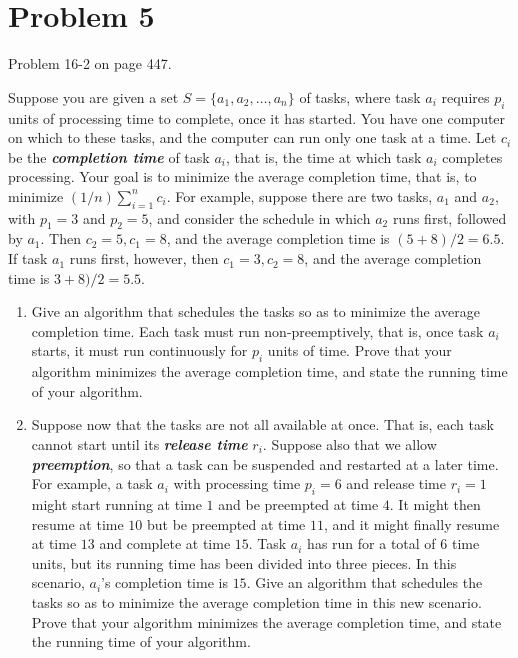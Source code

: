 \documentclass{../../class}
\begin{document}
\section*{Problem 5}
\begin{tcolorbox}
    Problem 16-2 on page 447.
\end{tcolorbox}
Suppose you are given a set $S = \{a_1, a_2, \dots, a_n\}$ of tasks, where task $a_i$ requires $p_i$ units of processing time to complete, once it has started. You have one computer on which to these tasks, and the computer can run only one task at a time. Let $c_i$ be the \textbf{\textit{completion time}} of task $a_i$, that is, the time at which task $a_i$ completes processing. Your goal is to minimize the average completion time, that is, to minimize $(1 / n) \sum_{i=1}^{n} c_i$. For example, suppose there are two tasks, $a_1$ and $a_2$, with $p_1 = 3$ and $p_2 = 5$, and consider the schedule in which $a_2$ runs first, followed by $a_1$. Then $c_2 = 5, c_1 = 8$, and the average completion time is $(5 + 8) / 2 = 6.5$. If task $a_1$ runs first, however, then $c_1 = 3, c_2 = 8$, and the average completion time is $3 + 8) / 2 = 5.5$.
\begin{enumerate}[label=\textbf{\textit{\alph*}}.]
    \item Give an algorithm that schedules the tasks so as to minimize the average completion time. Each task must run non-preemptively, that is, once task $a_i$ starts, it must run continuously for $p_i$ units of time. Prove that your algorithm minimizes the average completion time, and state the running time of your algorithm.
    \item Suppose now that the tasks are not all available at once. That is, each task cannot start until its \textbf{\textit{release time}} $r_i$. Suppose also that we allow \textbf{\textit{preemption}}, so that a task can be suspended and restarted at a later time. For example, a task $a_i$ with processing time $p_i = 6$ and release time $r_i = 1$ might start running at time $1$ and be preempted at time $4$. It might then resume at time $10$ but be preempted at time $11$, and it might finally resume at time $13$ and complete at time $15$. Task $a_i$ has run for a total of $6$ time units, but its running time has been divided into three pieces. In this scenario, $a_i$’s completion time is $15$. Give an algorithm that schedules the tasks so as to minimize the average completion time in this new scenario. Prove that your algorithm minimizes the average completion time, and state the running time of your algorithm.
\end{enumerate}
\end{document}
